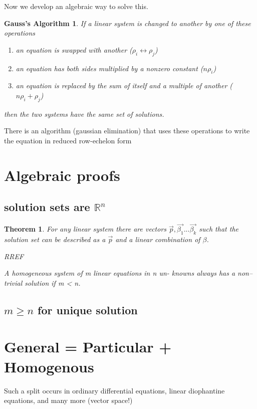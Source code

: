 \documentclass{article}
\begin{document}
Now we develop an algebraic way to solve this.

\newtheorem*{GA}{Gauss's Algorithm}
\begin{GA}
If a linear system is changed to another by
one of these operations
\begin{enumerate}\itemsep0pt
\item{an equation is swapped with another ($\rho_i \leftrightarrow \rho_j$)}
\item{an equation has both sides multiplied by a nonzero constant ($n\rho_i$)}
\item{an equation is replaced by the sum of itself and a multiple of another ($n\rho_i + \rho_j$)}
\end{enumerate}
then the two systems have the same set of solutions.
\end{GA}

There is an algorithm (gaussian elimination) that uses these operations to write the equation in reduced row-echelon form

\section{Algebraic proofs}

\subsection*{solution sets are $\mathbb{R}^n$}

\newtheorem*{PH}{Theorem}
\begin{PH}
For any linear system there are vectors $\vec{p}, \vec{\beta_1}...\vec{\beta_k}$ such that the solution set can be described as a $\vec{p}$ and a linear combination of $\beta$.

RREF

A homogeneous system of m linear equations in n un-
knowns always has a non–trivial solution if m < n.


\end{PH}

\subsection*{$m \ge n$ for unique solution}


\section{General = Particular + Homogenous}

Such a split occurs in ordinary differential equations, linear diophantine equations, and many more (vector space!)
\end{document}
